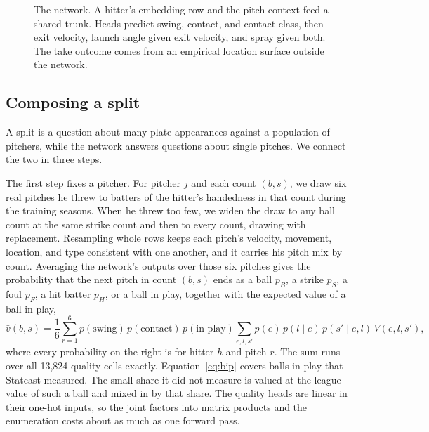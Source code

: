 \documentclass[11pt,letterpaper]{article}
\begin{document}
\begin{figure}[t]
\centering
{}
\caption{The network. A hitter's embedding row and the pitch context feed a shared trunk. Heads predict swing, contact, and contact class, then exit velocity, launch angle given exit velocity, and spray given both. The take outcome comes from an empirical location surface outside the network.}
\label{fig:arch}
\end{figure}

\subsection{Composing a split}
\label{sec:compose}

A split is a question about many plate appearances against a population of pitchers, while the network answers questions about single pitches. We connect the two in three steps.

The first step fixes a pitcher. For pitcher $j$ and each count $(b,s)$, we draw six real pitches he threw to batters of the hitter's handedness in that count during the training seasons. When he threw too few, we widen the draw to any ball count at the same strike count and then to every count, drawing with replacement. Resampling whole rows keeps each pitch's velocity, movement, location, and type consistent with one another, and it carries his pitch mix by count. Averaging the network's outputs over those six pitches gives the probability that the next pitch in count $(b,s)$ ends as a ball $\bar p_B$, a strike $\bar p_S$, a foul $\bar p_F$, a hit batter $\bar p_H$, or a ball in play, together with the expected value of a ball in play,
\begin{equation}
\bar v(b,s) = \frac{1}{6}\sum_{r=1}^{6} p(\text{swing}) \, p(\text{contact}) \, p(\text{in play}) \sum_{e,l,s'} p(e)\,p(l \mid e)\,p(s' \mid e,l)\, V(e,l,s'),
\label{eq:bip}
\end{equation}
where every probability on the right is for hitter $h$ and pitch $r$. The sum runs over all 13,824 quality cells exactly. Equation~\ref{eq:bip} covers balls in play that Statcast measured. The small share it did not measure is valued at the league value of such a ball and mixed in by that share. The quality heads are linear in their one-hot inputs, so the joint factors into matrix products and the enumeration costs about as much as one forward pass.
\end{document}
